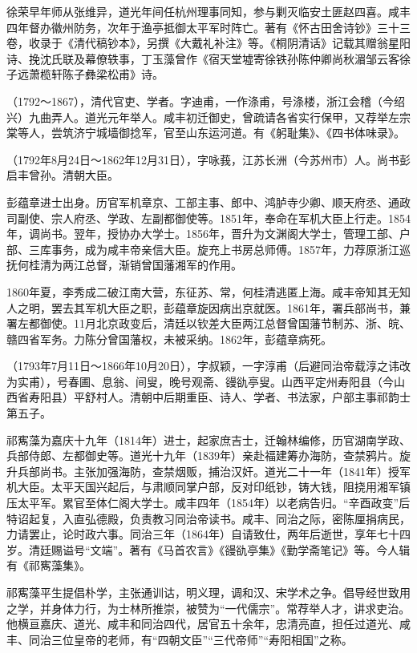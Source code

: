 \begin{description}
        徐荣早年师从张维异，道光年间任杭州理事同知，参与剿灭临安土匪赵四喜。咸丰四年督办徽州防务，次年于渔亭抵御太平军时阵亡。著有《怀古田舍诗钞》三十三卷，收录于《清代稿钞本》，另撰《大戴礼补注》等。《桐阴清话》记载其赠翁星阳诗、挽沈氏联及幕僚轶事，丁玉藻曾作《宿天堂墟寄徐铁孙陈仲卿尚秋湄邹云客徐子远萧榄轩陈子彝梁松甫》诗。
  \item[宗稷辰] （1792～1867），清代官吏、学者。字迪甫，一作涤甫，号涤楼，浙江会稽（今绍兴）九曲弄人。道光元年举人。咸丰初迁御史，曾疏请各省实行保甲，又荐举左宗棠等人，尝筑济宁城墙御捻军，官至山东运河道。有《躬耻集》、《四书体味录》。
  \item[彭蕴章] （1792年8月24日～1862年12月31日），字咏莪，江苏长洲（今苏州市）人。尚书彭启丰曾孙。清朝大臣。\par
        彭蕴章进士出身。历官军机章京、工部主事、郎中、鸿胪寺少卿、顺天府丞、通政司副使、宗人府丞、学政、左副都御使等。1851年，奉命在军机大臣上行走。1854年，调尚书。翌年，授协办大学士。1856年，晋升为文渊阁大学士，管理工部、户部、三库事务，成为咸丰帝亲信大臣。旋充上书房总师傅。1857年，力荐原浙江巡抚何桂清为两江总督，渐销曾国藩湘军的作用。\par
        1860年夏，李秀成二破江南大营，东征苏、常，何桂清逃匿上海。咸丰帝知其无知人之明，罢去其军机大臣之职，彭蕴章旋因病出京就医。1861年，署兵部尚书，兼署左都御使。11月北京政变后，清廷以钦差大臣两江总督曾国藩节制苏、浙、皖、赣四省军务。力陈分曾国藩权，未被采纳。1862年，彭蕴章病死。
  \item[祁寯藻] （1793年7月11日～1866年10月20日），字叔颖，一字淳甫（后避同治帝载淳之讳改为实甫），号春圃、息翁、间叟，晚号观斋、䜱䜪亭叟。山西平定州寿阳县（今山西省寿阳县）平舒村人。清朝中后期重臣、诗人、学者、书法家，户部主事祁韵士第五子。\par
        祁寯藻为嘉庆十九年（1814年）进士，起家庶吉士，迁翰林编修，历官湖南学政、兵部侍郎、左都御史等。道光十九年（1839年）亲赴福建筹办海防，查禁鸦片。旋升兵部尚书。主张加强海防，查禁烟贩，捕治汉奸。道光二十一年（1841年）授军机大臣。太平天国兴起后，与肃顺同掌户部，反对印纸钞，铸大钱，阻挠用湘军镇压太平军。累官至体仁阁大学士。咸丰四年（1854年）以老病告归。“辛酉政变”后特诏起复，入直弘德殿，负责教习同治帝读书。咸丰、同治之际，密陈厘捐病民，力请罢止，论时政六事。同治三年（1864年）自请致仕，两年后逝世，享年七十四岁。清廷赐谥号“文端”。著有《马首农言》《䜱䜪亭集》《勤学斋笔记》等。今人辑有《祁寯藻集》。\par
        祁寯藻平生提倡朴学，主张通训诂，明义理，调和汉、宋学术之争。倡导经世致用之学，并身体力行，为士林所推崇，被赞为“一代儒宗”。常荐举人才，讲求吏治。他横亘嘉庆、道光、咸丰和同治四代，居官五十余年，忠清亮直，担任过道光、咸丰、同治三位皇帝的老师，有“四朝文臣”“三代帝师”“寿阳相国”之称。

\end{description}
